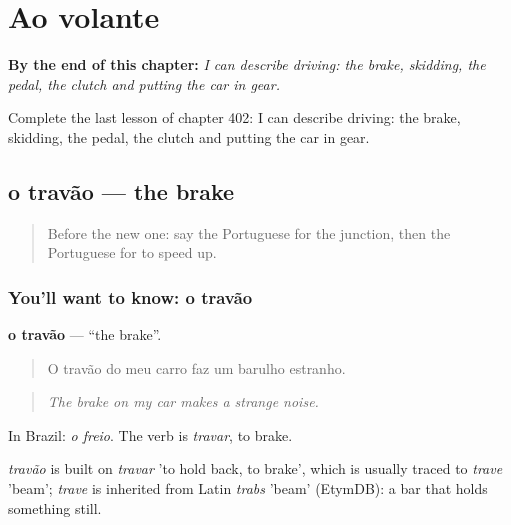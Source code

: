 
\chapter{Ao volante}
\label{ch:pt-ao-volante}

\begin{chapteropening}
\textbf{By the end of this chapter:} \emph{I can describe driving: the brake, skidding, the pedal, the clutch and putting the car in gear.}

Complete the last lesson of chapter 402: I can describe driving: the brake, skidding, the pedal, the clutch and putting the car in gear.
\end{chapteropening}

\section[o travão]{o travão — the brake}

\label{lesson:PT-C402-travao}



\begin{quote}
Before the new one: say the Portuguese for the junction, then the Portuguese for to speed up.
\end{quote}

\subsection*{You'll want to know: o travão}
\textbf{o travão} — \textquotedblleft{}the brake\textquotedblright{}.

\begin{quote}
O travão do meu carro faz um barulho estranho.
\end{quote}

\begin{quote}
\emph{The brake on my car makes a strange noise.}
\end{quote}

In Brazil: \emph{o freio}. The verb is \emph{travar}, to brake.

\begin{cousinweb}
\emph{travão} is built on \emph{travar} 'to hold back, to brake', which is usually traced to \emph{trave} 'beam'; \emph{trave} is inherited from Latin \emph{trabs} 'beam' (EtymDB): a bar that holds something still.
\end{cousinweb}

